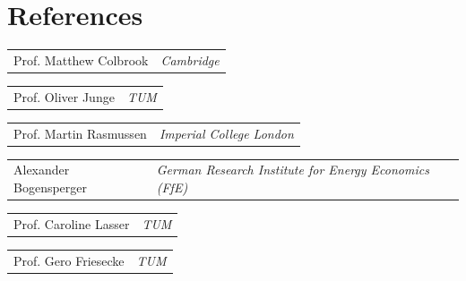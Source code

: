 \documentclass[10pt,a4paper]{article}
\makeatletter
\newcommand{\referenceentry}[2]{%
    \begin{tabularx}{\textwidth}{@{}X>{\raggedleft\arraybackslash}p{9cm}@{}}
        #1 & \textit{#2}
    \end{tabularx}%
}
\makeatother
\begin{document}
\section{References}

\referenceentry{Prof. Matthew Colbrook}{Cambridge}
\smallskip
\referenceentry{Prof. Oliver Junge}{TUM}
\smallskip
\referenceentry{Prof. Martin Rasmussen}{Imperial College London}
\smallskip
\referenceentry{Alexander Bogensperger}{German Research Institute for Energy Economics (FfE)}
\smallskip
\referenceentry{Prof. Caroline Lasser}{TUM}
\smallskip
\referenceentry{Prof. Gero Friesecke}{TUM}

\end{document}
